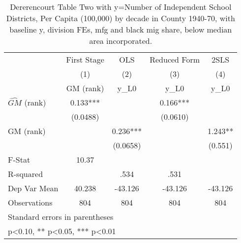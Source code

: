 \begin{table}[htbp]\centering
\def\sym#1{\ifmmode^{#1}\else\(^{#1}\)\fi}
\caption{Dererencourt Table Two with y=Number of Independent School Districts, Per Capita (100,000) by decade in County 1940-70, with baseline y, division FEs, mfg and black mig share, below median area incorporated.}
\begin{tabular}{l*{4}{c}}
\toprule
                    & First Stage   &         OLS   &Reduced Form   &        2SLS   \\
                    &\multicolumn{1}{c}{(1)}&\multicolumn{1}{c}{(2)}&\multicolumn{1}{c}{(3)}&\multicolumn{1}{c}{(4)}\\
                    &\multicolumn{1}{c}{GM  (rank)}&\multicolumn{1}{c}{y\_L0}&\multicolumn{1}{c}{y\_L0}&\multicolumn{1}{c}{y\_L0}\\
\midrule
$\hat{GM}$ (rank)   &       0.133***&               &       0.166***&               \\
                    &    (0.0488)   &               &    (0.0610)   &               \\
\addlinespace
GM  (rank)          &               &       0.236***&               &       1.243** \\
                    &               &    (0.0658)   &               &     (0.551)   \\
\midrule
F-Stat              &       10.37   &               &               &               \\
R-squared           &               &        .534   &        .531   &               \\
Dep Var Mean        &      40.238   &     -43.126   &     -43.126   &     -43.126   \\
Observations        &         804   &         804   &         804   &         804   \\
\bottomrule
\multicolumn{5}{l}{\footnotesize Standard errors in parentheses}\\
\multicolumn{5}{l}{\footnotesize * p<0.10, ** p<0.05, *** p<0.01}\\
\end{tabular}
\end{table}

